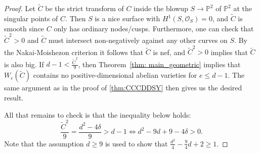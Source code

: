 \documentclass[10pt,a4paper]{amsart}
\renewcommand{\P}{\mathbb{P}}
\newcommand{\tC}{\widetilde{C}}
\begin{document}
\begin{proof}
    Let $\tC$ be the strict transform of $C$ inside the blowup $S \rightarrow \mathbb{P}^2$ of $\P^{2}$ at the singular points of $C$. Then $S$ is a nice surface with $H^1(S,\mathcal{O}_S)=0$, and $\tC$ is smooth since $C$ only has ordinary nodes/cusps. Furthermore, one can check that $\tC^{2} > 0$ and $\tC$ must intersect non-negatively against any other curves on $S$. By the Nakai-Moishezon criterion it follows that $\tC$ is nef, and $\tC^{2} > 0$ implies that $\tC$ is also big. If $d-1 < \frac{\tC^2}{9}$, then Theorem~\ref{thm: main_geometric} implies that $W_e(\tC)$ contains no positive-dimensional abelian varieties for $e \leq d-1$. The same argument as in the proof of \cref{thm:CCCDDSY} %
    then gives us the desired result.
    
    All that remains to check is that the inequality below holds:
    \begin{equation*}
        \frac{\tC^2}{9} = \frac{d^2-4\delta}{9} > d-1 \iff d^2-9d+9-4\delta >0.
    \end{equation*}
    Note that the assumption $d \geq 9$ is used to show that $\frac{d^2}{4}-\frac{9}{4}d+2 \geq 1$.
\end{proof}
\end{document}
